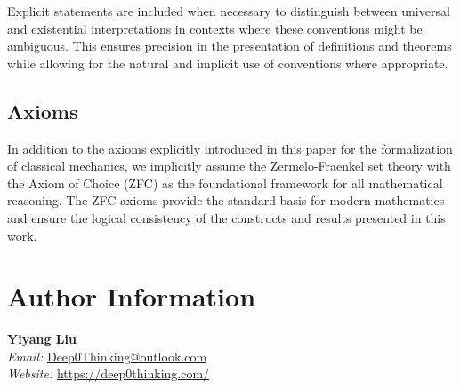 \documentclass[12pt]{amsart}
\begin{document}
Explicit statements are included when necessary to distinguish between universal and existential interpretations in contexts where these conventions might be ambiguous. This ensures precision in the presentation of definitions and theorems while allowing for the natural and implicit use of conventions where appropriate.

\subsection{Axioms}

In addition to the axioms explicitly introduced in this paper for the formalization of classical mechanics, we implicitly assume the Zermelo-Fraenkel set theory with the Axiom of Choice (ZFC) as the foundational framework for all mathematical reasoning. The ZFC axioms provide the standard basis for modern mathematics and ensure the logical consistency of the constructs and results presented in this work.

\newpage




\section*{Author Information}
\noindent
\textbf{Yiyang Liu} \\[0.5em]
\noindent
\textit{Email:} \href{mailto:Deep0Thinking@outlook.com}{Deep0Thinking@outlook.com} \\[0.25em]
\noindent
\textit{Website:} \href{https://deep0thinking.com/}{https://deep0thinking.com/}
\end{document}
